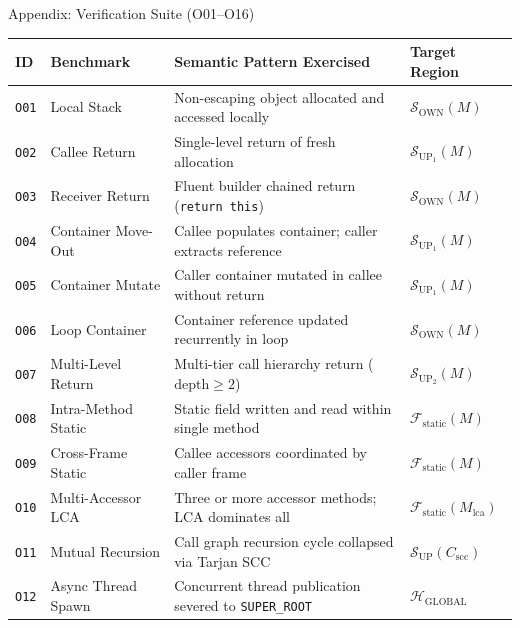 \documentclass[11pt]{beamer}
\begin{document}
\begin{frame}{Appendix: Verification Suite (O01--O16)}
  \vspace{-0.3em}
  \begin{table}[h]
    \centering
    \fontsize{5.2pt}{6.4pt}\selectfont
    \setlength{\tabcolsep}{3pt}
    \renewcommand{\arraystretch}{1.12}
    \begin{tabular}{@{}llp{5.5cm}l@{}}
      \toprule
      \textbf{ID} & \textbf{Benchmark} & \textbf{Semantic Pattern Exercised} & \textbf{Target Region} \\
      \midrule
      \texttt{O01} & Local Stack & Non-escaping object allocated and accessed locally & $\mathcal{S}_{\text{OWN}}(M)$ \\
      \texttt{O02} & Callee Return & Single-level return of fresh allocation & $\mathcal{S}_{\text{UP}_1}(M)$ \\
      \texttt{O03} & Receiver Return & Fluent builder chained return (\texttt{return this}) & $\mathcal{S}_{\text{OWN}}(M)$ \\
      \texttt{O04} & Container Move-Out & Callee populates container; caller extracts reference & $\mathcal{S}_{\text{UP}_1}(M)$ \\
      \texttt{O05} & Container Mutate & Caller container mutated in callee without return & $\mathcal{S}_{\text{UP}_1}(M)$ \\
      \texttt{O06} & Loop Container & Container reference updated recurrently in loop & $\mathcal{S}_{\text{OWN}}(M)$ \\
      \texttt{O07} & Multi-Level Return & Multi-tier call hierarchy return ($\text{depth} \ge 2$) & $\mathcal{S}_{\text{UP}_2}(M)$ \\
      \texttt{O08} & Intra-Method Static & Static field written and read within single method & $\mathcal{F}_{\text{static}}(M)$ \\
      \texttt{O09} & Cross-Frame Static & Callee accessors coordinated by caller frame & $\mathcal{F}_{\text{static}}(M)$ \\
      \texttt{O10} & Multi-Accessor LCA & Three or more accessor methods; LCA dominates all & $\mathcal{F}_{\text{static}}(M_{\text{lca}})$ \\
      \texttt{O11} & Mutual Recursion & Call graph recursion cycle collapsed via Tarjan SCC & $\mathcal{S}_{\text{UP}}(C_{\text{scc}})$ \\
      \texttt{O12} & Async Thread Spawn & Concurrent thread publication severed to \texttt{SUPER\_ROOT} & $\mathcal{H}_{\text{GLOBAL}}$ \\

\end{tabular}
\end{table}
\end{frame}
\end{document}
